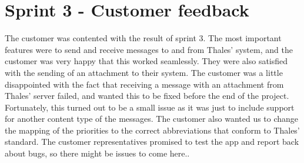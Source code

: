 \section{Sprint 3 - Customer feedback}

The customer was contented with the result of sprint 3. The most important features were to send and receive messages to and from Thales' system, and the customer was very happy that this worked seamlessly. They were also satisfied with the sending of an attachment to their system.
\newline
\newline
The customer was a little disappointed with the fact that receiving a message with an attachment from Thales' server failed, and wanted this to be fixed before the end of the project. Fortunately, this turned out to be a small issue as it was just to include support for another content type of the messages. The customer also wanted us to change the mapping of the priorities to the correct abbreviations that conform to Thales' standard. 
\newline
\newline
The customer representatives promised to test the app and report back about bugs, so there might be issues to come here..